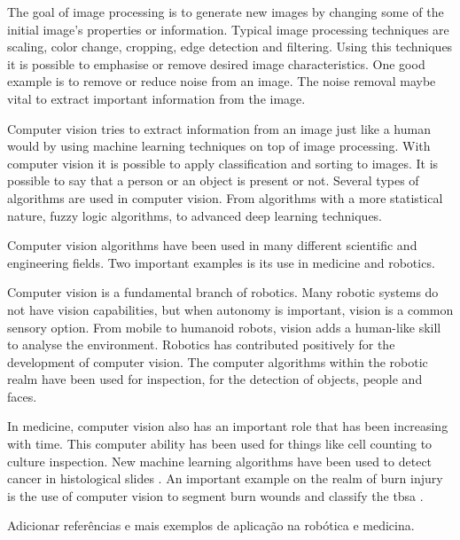 The goal of image processing is to generate new images by changing some of the initial image's properties or information. Typical image processing techniques are scaling, color change, cropping, edge detection and filtering. Using this techniques it is possible to emphasise or remove desired image characteristics. One good example is to remove or reduce noise from an image. The noise removal maybe vital to extract important information from the image.

Computer vision tries to extract information from an image just like a human would by using machine learning techniques on top of image processing. With computer vision it is possible to apply classification and sorting to images. It is possible to say that a person or an object is present or not. Several types of algorithms are used in computer vision. From algorithms with a more statistical nature, fuzzy logic algorithms, to advanced deep learning techniques.

Computer vision algorithms have been used in many different scientific and engineering fields. Two important examples is its use in medicine and robotics.

Computer vision is a fundamental branch of robotics. Many robotic systems do not have vision capabilities, but when autonomy is important, vision is a common sensory option. From mobile to humanoid robots, vision adds a human-like skill to analyse the environment. Robotics has contributed positively for the development of computer vision. The computer algorithms within the robotic realm have been used for inspection, for the detection of objects, people and faces.

In medicine, computer vision also has an important role that has been increasing with time. This computer ability has been used for things like cell counting to culture inspection. New machine learning algorithms have been used to detect cancer in histological slides \cite{Araujo2017_classification_breast_cancer_histology}. An important example on the realm of burn injury is the use of computer vision to segment burn wounds and classify the \gls{tbsa} \cite{Wantanajittikul2012_automatic_segmentation_degree_identification_burn_wounds}.

{\color{red} Adicionar referências e mais exemplos de aplicação na robótica e medicina.}




